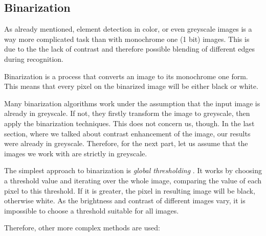 \subsection{Binarization}

As already mentioned, element detection in color, or even greyscale images is a way more complicated task than with monochrome one (1 bit) images. This is due to the the lack of contrast and therefore possible blending of different edges during recognition.

Binarization is a process that converts an image to its monochrome one form. This means that every pixel on the binarized image will be either black or white.

Many binarization algorithms work under the assumption that the input image is already in greyscale. If not, they firstly transform the image to greyscale, then apply the binarization techniques. This does not concern us, though. In the last section, where we talked about contrast enhancement of the image, our results were already in greyscale. Therefore, for the next part, let us assume that the images we work with are strictly in greyscale.

The simplest approach to binarization is \emph{global thresholding} \citep{globalThresh}. It works by choosing a threshold value and iterating over the whole image, comparing the value of each pixel to this threshold. If it is greater, the pixel in resulting image will be black, otherwise white. As the brightness and contrast of different images vary, it is impossible to choose a threshold suitable for all images.

Therefore, other more complex methods are used:

